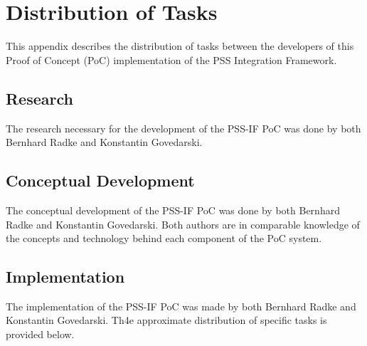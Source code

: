 \chapter{Distribution of Tasks}
\label{chap:conclusion}

This appendix describes the distribution of tasks between the developers of this Proof of Concept (PoC) implementation of the PSS Integration Framework.

\section*{Research}

The research necessary for the development of the PSS-IF PoC was done by both Bernhard Radke and Konstantin Govedarski.

\section*{Conceptual Development}

The conceptual development of the PSS-IF PoC was done by both Bernhard Radke and Konstantin Govedarski. Both authors are in comparable knowledge of the concepts and technology behind each component of the PoC system.

\section*{Implementation}

The implementation of the PSS-IF PoC was made by both Bernhard Radke and Konstantin Govedarski. Th4e approximate distribution of specific tasks is provided below.

